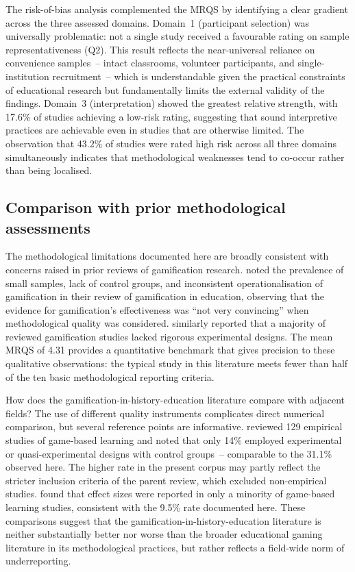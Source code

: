 \documentclass[etq]{acnsart}
\begin{document}
	The risk-of-bias analysis complemented the MRQS by identifying a clear gradient across the three assessed domains. Domain~1 (participant selection) was universally problematic: not a single study received a favourable rating on sample representativeness (Q2). This result reflects the near-universal reliance on convenience samples~-- intact classrooms, volunteer participants, and single-institution recruitment~-- which is understandable given the practical constraints of educational research but fundamentally limits the external validity of the findings. Domain~3 (interpretation) showed the greatest relative strength, with 17.6\% of studies achieving a low-risk rating, suggesting that sound interpretive practices are achievable even in studies that are otherwise limited. The observation that 43.2\% of studies were rated high risk across all three domains simultaneously indicates that methodological weaknesses tend to co-occur rather than being localised.
	
	\subsection{Comparison with prior methodological assessments}
	\label{sec:discussion_comparison}
	
	The methodological limitations documented here are broadly consistent with concerns raised in prior reviews of gamification research. \citet{DichevDicheva2017} noted the prevalence of small samples, lack of control groups, and inconsistent operationalisation of gamification in their review of gamification in education, observing that the evidence for gamification's effectiveness was ``not very convincing'' when methodological quality was considered. \citet{KoivistoHamari2019} similarly reported that a majority of reviewed gamification studies lacked rigorous experimental designs. The mean MRQS of 4.31 provides a quantitative benchmark that gives precision to these qualitative observations: the typical study in this literature meets fewer than half of the ten basic methodological reporting criteria.
	
	How does the gamification-in-history-education literature compare with adjacent fields? The use of different quality instruments complicates direct numerical comparison, but several reference points are informative. \citet{Connolly2012} reviewed 129 empirical studies of game-based learning and noted that only 14\% employed experimental or quasi-experimental designs with control groups~-- comparable to the 31.1\% observed here. The higher rate in the present corpus may partly reflect the stricter inclusion criteria of the parent review, which excluded non-empirical studies. \citet{Clark2016} found that effect sizes were reported in only a minority of game-based learning studies, consistent with the 9.5\% rate documented here. These comparisons suggest that the gamification-in-history-education literature is neither substantially better nor worse than the broader educational gaming literature in its methodological practices, but rather reflects a field-wide norm of underreporting.
	
\end{document}
